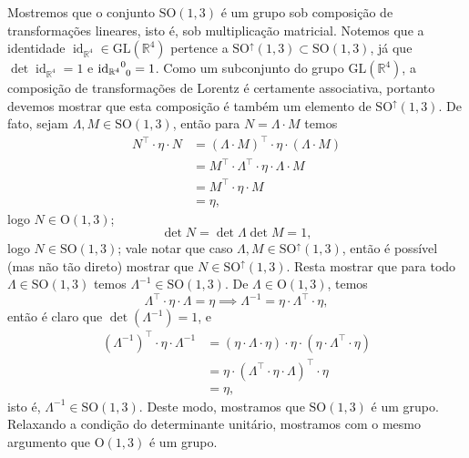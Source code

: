 \documentclass[12pt,a4paper]{article}
\numberwithin{equation}{section}
\newcommand\id[1]{\operatorname{id}_{#1}}
\begin{document}
Mostremos que o conjunto \(\mathrm{SO}(1,3)\) é um grupo sob composição de transformações lineares, isto é, sob multiplicação matricial. Notemos que a identidade \(\id{\mathbb{R}^4} \in \mathrm{GL}(\mathbb{R}^4)\) pertence a \(\mathrm{SO}^\uparrow(1,3) \subset \mathrm{SO}(1,3)\), já que \(\det\id{\mathbb{R}^4} = 1\) e \({\id{\mathbb{R}^4}}\indices{^0_0} = 1\). Como um subconjunto do grupo \(\mathrm{GL}(\mathbb{R}^4)\), a composição de transformações de Lorentz é certamente associativa, portanto devemos mostrar que esta composição é também um elemento de \(\mathrm{SO}^\uparrow(1,3)\). De fato, sejam \(\Lambda, M \in \mathrm{SO}(1,3)\), então para \(N = \Lambda \cdot M\) temos
\begin{align*}
    N^\top \cdot \eta \cdot N &= (\Lambda \cdot M)^\top \cdot \eta \cdot (\Lambda \cdot M)\\
                                  &= M^\top \cdot \Lambda^\top \cdot \eta \cdot \Lambda \cdot M\\
                                  &= M^\top \cdot \eta \cdot M\\
                                  &= \eta,
\end{align*}
logo \(N \in \mathrm{O}(1,3)\);
\begin{equation*}
    \det N = \det \Lambda \det M = 1,
\end{equation*}
logo \(N \in \mathrm{SO}(1,3)\); vale notar que caso \(\Lambda, M \in \mathrm{SO}^\uparrow(1,3)\), então é possível (mas não tão direto) mostrar que \(N \in \mathrm{SO}^\uparrow(1,3)\). Resta mostrar que para todo \(\Lambda \in \mathrm{SO}(1,3)\) temos \(\Lambda^{-1} \in \mathrm{SO}(1,3)\). De \(\Lambda \in \mathrm{O}(1,3)\), temos
\begin{equation*}
    \Lambda^\top\cdot \eta\cdot \Lambda = \eta \implies \Lambda^{-1} = \eta \cdot \Lambda^\top \cdot \eta,
\end{equation*}
então é claro que \(\det \left(\Lambda^{-1}\right) = 1\), e
\begin{align*}
    \left(\Lambda^{-1}\right)^\top \cdot \eta \cdot \Lambda^{-1} &= \left(\eta \cdot \Lambda \cdot \eta \right) \cdot \eta \cdot \left(\eta \cdot \Lambda^\top \cdot \eta\right)\\
                                                                 &= \eta \cdot \left(\Lambda^\top \cdot \eta \cdot \Lambda \right)^\top \cdot \eta\\
                                                                 &= \eta,
\end{align*}
isto é, \(\Lambda^{-1} \in \mathrm{SO}(1,3)\). Deste modo, mostramos que \(\mathrm{SO}(1,3)\) é um grupo. Relaxando a condição do determinante unitário, mostramos com o mesmo argumento que \(\mathrm{O}(1,3)\) é um grupo.
\end{document}
